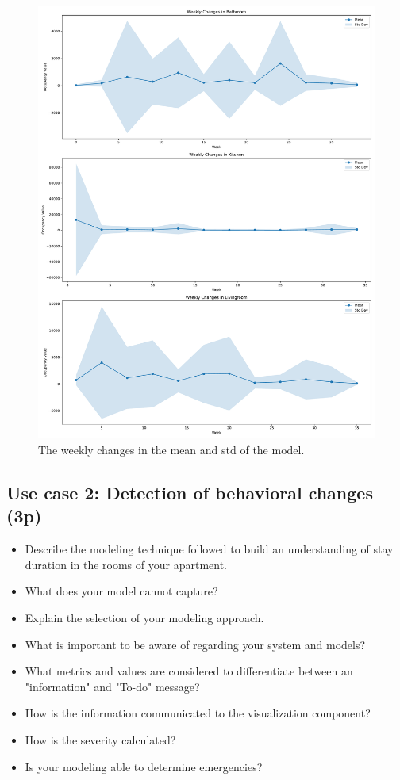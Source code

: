 \documentclass[A4,10pt]{article}
\begin{document}
\begin{figure}[H]
	\centering
	\includegraphics[width=1.15\textwidth]{weekly_changes.pdf}
	\caption{The weekly changes in the mean and std of the model.}
	\label{fig:detected_emergencies}
\end{figure}

\subsection{ Use case 2: Detection of behavioral changes (3p)}

\begin{itemize}
	\item Describe the modeling technique followed to build an understanding of stay duration in the rooms of your apartment.
	\item What does your model cannot capture?
	\item Explain the selection of your modeling approach.
	\item What is important to be aware of regarding your system and models?
	\item What metrics and values are considered to differentiate between an "information" and "To-do" message?
	\item How is the information communicated to the visualization component?
	\item How is the severity calculated? 
	\item Is your modeling able to determine emergencies?
\end{itemize}
\end{document}
